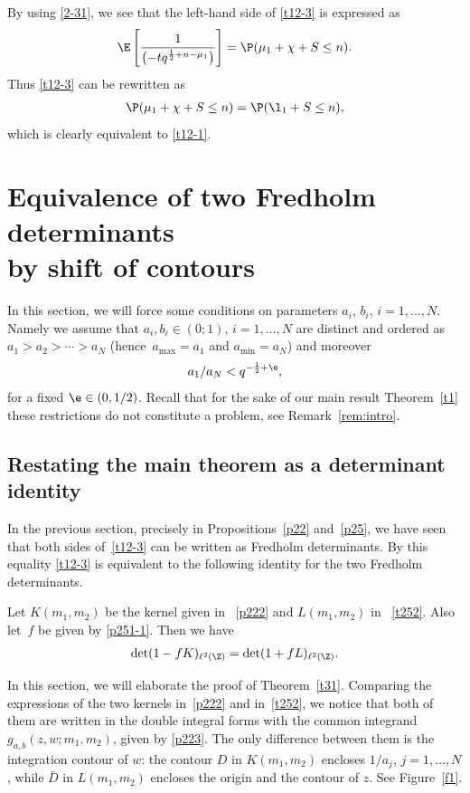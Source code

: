  By using \eqref{2-31}, we see that
 the left-hand side of \eqref{t12-3}
 is expressed as
 \begin{align*}
 \E
 \left[ \frac{1}{\bigl(-t q^{\frac12+n-\mu_1}\bigr)}\right]
 =\P(\mu_1+\chi+S\le n).
 \end{align*}
 Thus \eqref{t12-3} can be rewritten as
 \begin{align*}%
 \P(\mu_1+\chi+S\le n)
 =
 \P(\l_1+S\le n),
 \end{align*}
 which is clearly equivalent to \eqref{t12-1}.

\section[Equivalence of two Fredholm determinants by shift of contours]{Equivalence of two Fredholm determinants\\ by shift of contours} \label{s3}

In this section, we will force some conditions on parameters $a_i$, $b_i$,
$i=1,\dots,N$. Namely we assume that $a_i,b_i\in (0;1)$, $i=1,\dots,N $ are distinct and ordered as $a_1>a_2>\cdots > a_N$ (hence~${a_{\max}=a_1}$ and $a_{\min}=a_N$)
and moreover
\[
 a_{1}/a_{N}<q^{-\frac12+\e},
\]
for a fixed $\e \in (0,1/2)$. Recall that for the sake of our main result Theorem~\ref{t1} these restrictions do not constitute a problem, see Remark~\ref{rem:intro}.


\subsection{Restating the main theorem as a determinant identity}
\label{s31}
In the previous section, precisely in Propositions~\ref{p22} and~\ref{p25}, we have seen that both sides of~\eqref{t12-3} can be written as Fredholm determinants. By this equality \eqref{t12-3} is equivalent to the following identity for the two Fredholm determinants.
\begin{Theorem}
\label{t31}
Let $K(m_1,m_2)$ be the kernel given in ~\eqref{p222} and $L(m_1,m_2)$ in ~\eqref{t252}.
Also let~$f$ be given by \eqref{p251-1}.
Then we have
\begin{align}
\label{31}
\det(1-f K)_{\ell^2(\Z)}
=
\det(1+fL)_{\ell^2(\Z)}.
\end{align}
\end{Theorem}
In this section, we will elaborate the proof of Theorem~\ref{t31}.
Comparing the expressions of the two kernels in~\eqref{p222} and in~\eqref{t252}, we notice that both of them are written in the double integral forms with the common integrand $g_{a,b}(z,w;m_1,m_2)$, given by \eqref{p223}. The only difference between them is the integration contour of $w$: the contour $D$ in $K(m_1,m_2)$ encloses $1/a_j$, $j=1,\dots,N$, while $\bar{D}$ in $L(m_1,m_2)$ encloses the origin and the contour of $z$. See Figure~\ref{f1}.


